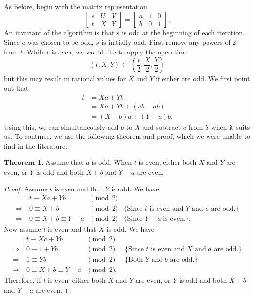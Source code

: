 \documentclass{ucalgthes1}
\theoremstyle{definition}
\newtheorem{thm}{Theorem}[section]
\newcommand{\matrixThreeTwo}[6]{\left[ \begin{array}{rrr} #1 & #2 & #3 \\ #4 & #5 & #6 \end{array} \right]}
\begin{document}
As before, begin with the matrix representation
\[
	\matrixThreeTwo{s}{U}{V}{t}{X}{Y} = \matrixThreeTwo{a}{1}{0}{b}{0}{1}.
\]
An invariant of the algorithm is that $s$ is odd at the beginning of each iteration.  Since $a$ was chosen to be odd, $s$ is initially odd.  First remove any powers of 2 from $t$.  While $t$ is even, we would like to apply the operation
\[
(t, X, Y) \gets \left( \frac{t}{2}, \frac{X}{2}, \frac{Y}{2} \right)
\]
but this may result in rational values for $X$ and $Y$ if either are odd. We first point out that
\begin{align*}
	t &= Xa + Yb \\
	  &= Xa + Yb + (ab - ab) \\
	  &= (X+b)a + (Y-a)b.
\end{align*}
Using this, we can simultaneously add $b$ to $X$ and subtract $a$ from $Y$ when it suits us.  To continue, we use the following theorem and proof, which we were unable to find in the literature.

\begin{thm}
\label{thm:addBSubA}
Assume that $a$ is odd.  When $t$ is even, either both $X$ and $Y$ are even, or $Y$ is odd and both $X+b$ and $Y-a$ are even.
\end{thm}

\begin{proof}
Assume $t$ is even and that $Y$ is odd.  We have
\[
\begin{array}{rllr}
	         & t \equiv Xa + Yb & \pmod 2 \\
\Rightarrow~ & 0 \equiv X + b & \pmod 2 & \textrm{\{Since $t$ is even and $Y$ and $a$ are odd.\}} \\
\Rightarrow~ & 0 \equiv X + b \equiv Y - a & \pmod 2 & \textrm{\{Since $Y-a$ is even.\}}. 
\end{array}
\]
Now assume $t$ is even and that $X$ is odd.  We have
\[
\begin{array}{rllr}
	         & t \equiv Xa + Yb & \pmod 2 \\
\Rightarrow~ & 0 \equiv 1 + Yb & \pmod 2 & \textrm{ \{Since $t$ is even and $X$ and $a$ are odd.\}} \\
\Rightarrow~ & 1 \equiv Yb & \pmod 2 & \textrm{ \{Both $Y$ and $b$ are odd.\}} \\
\Rightarrow~ & 0 \equiv X + b \equiv Y - a & \pmod 2. 
\end{array}
\]
Therefore, if $t$ is even, either both $X$ and $Y$ are even, or $Y$ is odd and both $X+b$ and $Y-a$ are even.
\end{proof}
\end{document}

